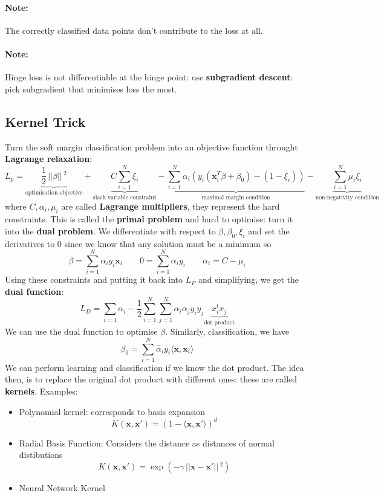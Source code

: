 \documentclass{article}
\renewcommand{\vec}[1]{\mathbf{#1}}
\renewcommand{\|}{\,\,|\,\,}
\newcommand{\norm}[1]{\,||#1||\,}
\begin{document}
\paragraph{Note:} The correctly classified data points don't contribute to the
loss at all.
\paragraph{Note:} Hinge loss is not differentiable at the hinge point: use
\textbf{subgradient descent}: pick subgradient that minimises loss the most.
\subsection{Kernel Trick}
Turn the soft margin classification problem into an objective function throught
\textbf{Lagrange relaxation}:
\[
  L_p = \underbrace{\frac12 \norm{\beta}^2}_{\text{optimisation objective}} +
  \underbrace{C \sum_{i=1}^N \xi_i}_{\text{slack variable constraint}} -
  \underbrace{\sum_{i = 1}^N \alpha_i(y_i(\vec{x}_i^T\beta + \beta_0 ) - (1 -
    \xi_i))}_{\text{maximal margin condition}} -
  \underbrace{\sum_{i=1}^N \mu_i \xi_i}_{\text{non-negativity condition}}
\]
where $C, \alpha_i, \mu_i$ are called \textbf{Lagrange multipliers}, they
represent the hard constraints.
This is called the \textbf{primal problem} and hard to optimise: turn it into
the \textbf{dual problem}.
We differentiate with respect to $\beta, \beta_0, \xi_i$ and set the derivatives
to 0 since we know that any solution must be a minimum so
\[
  \beta = \sum_{i = 1}^N \alpha_iy_i\vec{x}_i\quad\quad 0 = \sum_{i = 1}^N
  \alpha_iy_i\quad\quad \alpha_i = C - \mu_i
\]
Using these constraints and putting it back into $L_P$ and simplifying, we get
the \textbf{dual function}:
\[
  L_D = \sum_{i = 1}\alpha_i - \frac12 \sum_{i = 1}^N \sum_{j = 1}^N
  \alpha_i\alpha_jy_iy_j\underbrace{x_i^tx_j}_{\text{dot product}}
\]
We can use the dual function to optimise $\beta$.
Similarly, classification, we have
\[
  \beta_0 = \sum_{i = 1}^N \hat{\alpha}_iy_i\langle {\vec{x}, \vec{x}_i} \rangle
\]
We can perform learning and classification if we know the dot product. The idea
then, is to replace the original dot product with different ones: these are
called \textbf{kernels}.
Examples:
\begin{itemize}
\item Polynomial kernel: corresponds to basis expansion
  \[
    K(\vec{x}, \vec{x}') = (1 - \langle {\vec{x}, \vec{x}'} \rangle)^d
  \]
\item Radial Basis Function: Considers the distance as distances of normal distibutions
  \[
    K(\vec{x}, \vec{x}') = \exp(-\gamma\norm{\vec{x} - \vec{x}'}^2)
  \]
\item Neural Network Kernel
\end{itemize}
\end{document}

